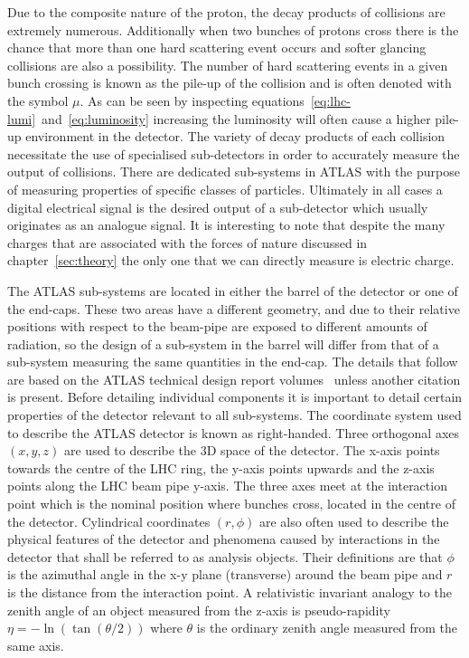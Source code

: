 Due to the composite nature of the proton, the decay products of collisions are
extremely numerous. Additionally when two bunches of protons cross there is the
chance that more than one hard scattering event occurs and softer glancing
collisions are also a possibility. The number of hard scattering events in a
given bunch crossing is known as the pile-up of the collision and is often
denoted with the symbol $\mu$. As can be seen by inspecting
equations~\ref{eq:lhc-lumi}~and~\ref{eq:luminosity} increasing the luminosity
will often cause a higher pile-up environment in the detector. The variety of
decay products of each collision necessitate the use of specialised
sub-detectors in order to accurately measure the output of collisions. There are
dedicated sub-systems in ATLAS with the purpose of measuring properties of
specific classes of particles. Ultimately in all cases a digital electrical
signal is the desired output of a sub-detector which usually originates as an
analogue signal. It is interesting to note that despite the many charges that
are associated with the forces of nature discussed in chapter~\ref{sec:theory}
the only one that we can directly measure is electric charge.

The ATLAS sub-systems are located in either the barrel of the detector or one of
the end-caps. These two areas have a different geometry, and due to their
relative positions with respect to the beam-pipe are exposed to different
amounts of radiation, so the design of a sub-system in the barrel will differ
from that of a sub-system measuring the same quantities in the end-cap. The
details that follow are based on the ATLAS technical design report
volumes~\cite{ATLAS-TDR-01, ATLAS-TDR-02} unless another citation is present.
Before detailing individual components it is important to detail certain
properties of the detector relevant to all sub-systems.  The coordinate system
used to describe the ATLAS detector is known as right-handed. Three orthogonal
axes $(x, y, z)$ are used to describe the 3D space of the detector. The x-axis
points towards the centre of the LHC ring, the y-axis points upwards and the
z-axis points along the LHC beam pipe y-axis. The three axes meet at the
interaction point which is the nominal position where bunches cross, located in
the centre of the detector. Cylindrical coordinates $(r, \phi)$ are also often
used to describe the physical features of the detector and phenomena caused by
interactions in the detector that shall be referred to as analysis objects.
Their definitions are that $\phi$ is the azimuthal angle in the x-y plane
(transverse) around the beam pipe and $r$ is the distance from the interaction
point. A relativistic invariant analogy to the zenith angle of an object
measured from the z-axis is pseudo-rapidity $\eta = - \ln(\tan(\theta / 2))$
where $\theta$ is the ordinary zenith angle measured from the same axis.

